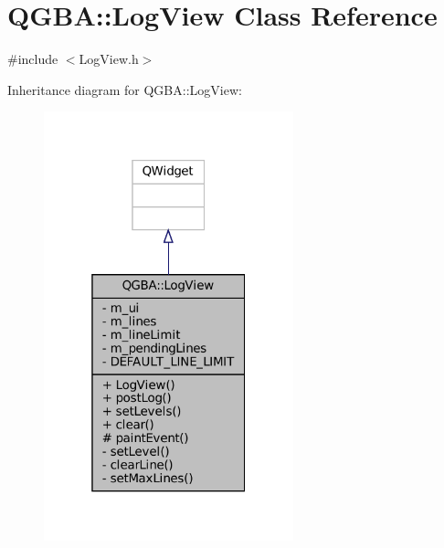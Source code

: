 \hypertarget{class_q_g_b_a_1_1_log_view}{}\section{Q\+G\+BA\+:\+:Log\+View Class Reference}
\label{class_q_g_b_a_1_1_log_view}


{\ttfamily \#include $<$Log\+View.\+h$>$}



Inheritance diagram for Q\+G\+BA\+:\+:Log\+View\+:
\nopagebreak
\begin{figure}[H]
\begin{center}
\leavevmode
\includegraphics[width=205pt]{class_q_g_b_a_1_1_log_view__inherit__graph}
\end{center}
\end{figure}


